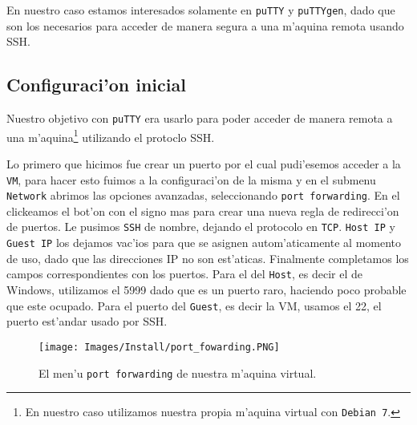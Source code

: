 \documentclass[11pt]{article}
\begin{document}
		En nuestro caso estamos interesados solamente en \texttt{puTTY} y \texttt{puTTYgen}, dado que son los necesarios para acceder de manera segura a una m'aquina remota usando SSH.
		
	
	\subsection{Configuraci'on inicial}
		Nuestro objetivo con \texttt{puTTY} era usarlo para poder acceder de manera remota a una m'aquina\footnote{En nuestro caso utilizamos nuestra propia m'aquina virtual con \texttt{Debian 7}.} utilizando el protoclo SSH.
		
		
		Lo primero que hicimos fue crear un puerto por el cual pudi'esemos acceder a la \texttt{VM}, para hacer esto fuimos a la configuraci'on de la misma y en el submenu \texttt{Network} abrimos las opciones avanzadas, seleccionando \texttt{port forwarding}. En el clickeamos el bot'on con el signo mas para crear una nueva regla de redirecci'on de puertos. Le pusimos \texttt{SSH} de nombre, dejando el protocolo en \texttt{TCP}. \texttt{Host IP} y \texttt{Guest IP} los dejamos vac'ios para que se asignen autom'aticamente al momento de uso, dado que las direcciones IP no son est'aticas. Finalmente completamos los campos correspondientes con los puertos. Para el del \texttt{Host}, es decir el de Windows, utilizamos el 5999 dado que es un puerto raro, haciendo poco probable que este ocupado. Para el puerto del \texttt{Guest}, es decir la VM, usamos el 22, el puerto est'andar usado por SSH.
		
		\begin{figure}[H]
    			\centering
    			\texttt{[image: Images/Install/port\_fowarding.PNG]}
    			\caption{El men'u \texttt{port forwarding} de nuestra m'aquina virtual.}
    			\label{fig:port_fowarding}
		\end{figure}

	
























\end{document}

